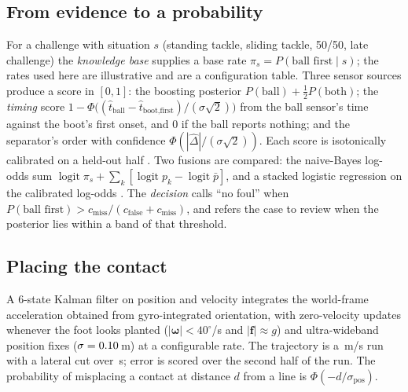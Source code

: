 \subsection{From evidence to a probability}
For a challenge with situation $s$ (standing tackle, sliding tackle, 50/50,
late challenge) the \emph{knowledge base} supplies a base rate
$\pi_s = P(\text{ball first}\mid s)$; the rates used here are illustrative and
are a configuration table. Three sensor sources produce a score in $[0,1]$:
the boosting posterior $P(\text{ball}) + \tfrac12 P(\text{both})$; the
\emph{timing} score $1-\Phi\!\big((\hat t_{\text{ball}} - \hat
t_{\text{boot,first}})/(\sigma\sqrt2)\big)$ from the ball sensor's time against
the boot's first onset, and $0$ if the ball reports nothing; and the
separator's order with confidence $\Phi(|\hat\Delta|/(\sigma\sqrt2))$. Each
score is isotonically calibrated on a held-out half
\cite{zadrozny2002transforming}. Two fusions are compared: the naive-Bayes
log-odds sum $\operatorname{logit}\pi_s + \sum_k
[\operatorname{logit} p_k - \operatorname{logit}\bar p]$, and a stacked
logistic regression on the calibrated log-odds \cite{wolpert1992stacked}. The
\emph{decision} calls ``no foul'' when $P(\text{ball first}) > c_{\text{miss}} /
(c_{\text{false}} + c_{\text{miss}})$, and refers the case to review when the
posterior lies within a band of that threshold.

\subsection{Placing the contact}
A 6-state Kalman filter on position and velocity integrates the world-frame
acceleration obtained from gyro-integrated orientation, with zero-velocity
updates whenever the foot looks planted ($|\boldsymbol\omega| < 40^\circ$/s
and $|\mathbf f| \approx g$) \cite{foxlin2005pedestrian, skog2010zero} and
ultra-wideband position fixes ($\sigma = 0.10$\,m) at a configurable
rate. The trajectory is a \LocSpeed\,m/s run with a lateral cut over
\LocDuration\,s; error is scored over the second half of the run. The
probability of misplacing a contact at distance $d$ from a line is
$\Phi(-d/\sigma_{\text{pos}})$.
